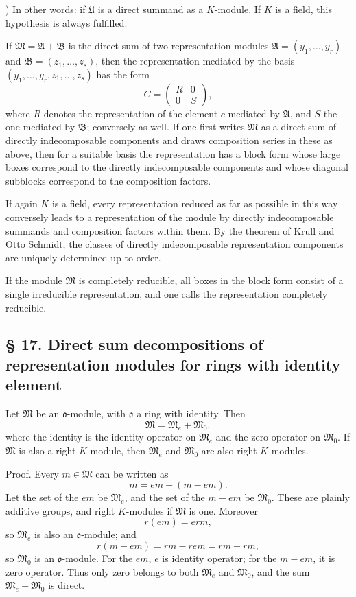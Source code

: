 \documentclass[11pt]{article}
\providecommand{\mA}{\mathfrak{A}}
\providecommand{\mB}{\mathfrak{B}}
\providecommand{\mM}{\mathfrak{M}}
\providecommand{\mU}{\mathfrak{U}}
\providecommand{\mo}{\mathfrak{o}}
\begin{document}
{\footnotesize{}) In other words: if $\mU$ is a direct summand as a $K$-module. If $K$ is a field, this hypothesis is always fulfilled.\par}

If $\mM=\mA+\mB$ is the direct sum of two representation modules $\mA=(y_1,\ldots,y_r)$ and $\mB=(z_1,\ldots,z_s)$, then the representation mediated by the basis $(y_1,\ldots,y_r,z_1,\ldots,z_s)$ has the form
\[
        C=\begin{pmatrix}R&0\\0&S\end{pmatrix},
\]
where $R$ denotes the representation of the element $c$ mediated by $\mA$, and $S$ the one mediated by $\mB$; conversely as well. If one first writes $\mM$ as a direct sum of directly indecomposable components and draws composition series in these as above, then for a suitable basis the representation has a block form whose large boxes correspond to the directly indecomposable components and whose diagonal subblocks correspond to the composition factors.

If again $K$ is a field, every representation reduced as far as possible in this way conversely leads to a representation of the module by directly indecomposable summands and composition factors within them. By the theorem of Krull and Otto Schmidt, the classes of directly indecomposable representation components are uniquely determined up to order.

If the module $\mM$ is completely reducible, all boxes in the block form consist of a single irreducible representation, and one calls the representation completely reducible.

\subsection*{§ 17. Direct sum decompositions of representation modules for rings with identity element}
Let $\mM$ be an $\mo$-module, with $\mo$ a ring with identity. Then
\[
        \mM=\mM_e+\mM_0,
\]
where the identity is the identity operator on $\mM_e$ and the zero operator on $\mM_0$. If $\mM$ is also a right $K$-module, then $\mM_e$ and $\mM_0$ are also right $K$-modules.

Proof. Every $m\in\mM$ can be written as
\[
        m=em+(m-em).
\]
Let the set of the $em$ be $\mM_e$, and the set of the $m-em$ be $\mM_0$. These are plainly additive groups, and right $K$-modules if $\mM$ is one. Moreover
\[
        r(em)=erm,
\]
so $\mM_e$ is also an $\mo$-module; and
\[
        r(m-em)=rm-rem=rm-rm,
\]
so $\mM_0$ is an $\mo$-module. For the $em$, $e$ is identity operator; for the $m-em$, it is zero operator. Thus only zero belongs to both $\mM_e$ and $\mM_0$, and the sum $\mM_e+\mM_0$ is direct.
\end{document}
